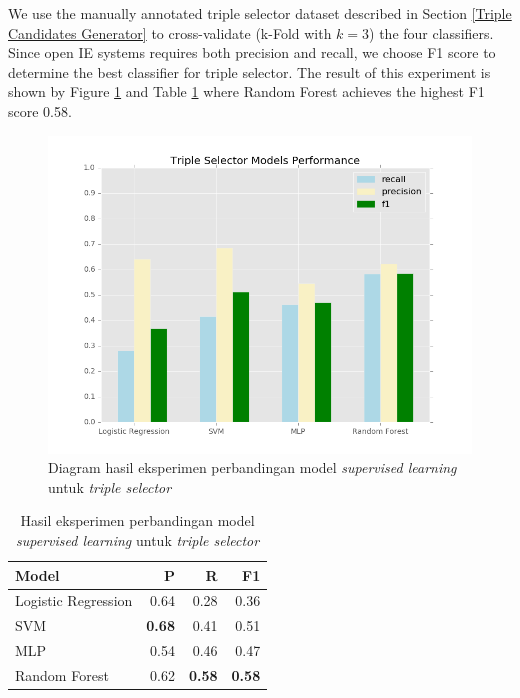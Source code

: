 We use the manually annotated triple selector dataset described in Section \ref{Triple Candidates Generator} to cross-validate\citep{kohavi1995study} (k-Fold with $k=3$) the four classifiers. Since open IE systems requires both precision and recall\citep{angeli2015leveraging}, we choose F1 score to determine the best classifier for triple selector. The result of this experiment is shown by Figure \ref{fig:models_performance} and Table \ref{tab:models_performance} where Random Forest achieves the highest F1 score 0.58.

\begin{figure}
	\includegraphics[width=\textwidth]{../images/models_performance.png}
	\caption{Diagram hasil eksperimen perbandingan model \textit{supervised learning} untuk \textit{triple selector}}
	\label{fig:models_performance}
\end{figure}

\begin{table}
\caption{Hasil eksperimen perbandingan model \textit{supervised learning} untuk \textit{triple selector}}
	\label{tab:models_performance}
	\centering
	\begin{tabular}{l r r r}
		\hline
		\textbf{Model} & \textbf{P} & \textbf{R} & \textbf{F1} \\
		\hline
		Logistic Regression & 0.64 & 0.28 & 0.36 \\
		SVM & \textbf{0.68} & 0.41 & 0.51 \\
		MLP & 0.54 & 0.46 & 0.47 \\
		Random Forest & 0.62 & \textbf{0.58} & \textbf{0.58} \\
		\hline
	\end{tabular}
\end{table}

